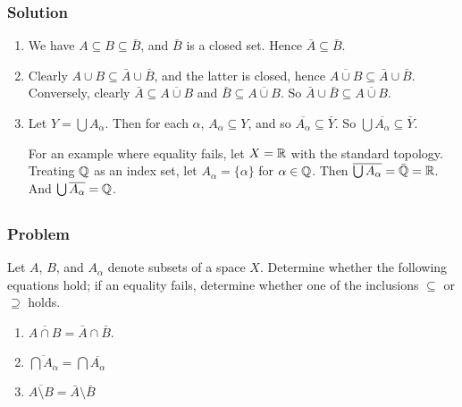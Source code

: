 \subsubsection{Solution}
\begin{enumerate}
 \item We have $A \subseteq B \subseteq \bar B$, and $\bar B$ is a closed set. Hence $\bar A \subseteq \bar B$.
 \item Clearly $A \cup B \subseteq \bar A \cup \bar B$, and the latter is closed, hence $\overline{A \cup B} \subseteq \bar A \cup \bar B$. Conversely, clearly $\bar A \subseteq \overline{A \cup B}$ and $\bar B \subseteq \overline{A \cup B}$. So $\bar A \cup \bar B \subseteq \overline{A \cup B}$.
 \item Let $Y = \bigcup A_\alpha$. Then for each $\alpha$, $A_\alpha \subseteq Y$, and so $\overline{A_\alpha} \subseteq \bar Y$. So $\bigcup \overline{A_\alpha} \subseteq \bar Y$.
 
 For an example where equality fails, let $X = \mathbb R$ with the standard topology. Treating $\mathbb Q$ as an index set, let $A_\alpha = \{\alpha\}$ for $\alpha \in \mathbb Q$. Then $\overline{\bigcup A_\alpha} = \bar {\mathbb Q} = \mathbb R$. And $\bigcup \overline{A_\alpha} = \mathbb Q$.
 \end{enumerate}

 
\setcounter{subsection}{7} %
\subsection{}
\subsubsection{Problem}
Let $A$, $B$, and $A_\alpha$ denote subsets of a space $X$. Determine whether the following equations hold; if an equality fails, determine whether one of the inclusions $\subseteq$ or $\supseteq$ holds.
\begin{enumerate}
 \item $\overline{A \cap B} = \bar A \cap \bar B$.
 \item $\overline{\bigcap A_\alpha} = \bigcap \overline{A_\alpha}$
 \item $\overline{A \setminus B} = \bar A \setminus \bar B$
\end{enumerate}
 

